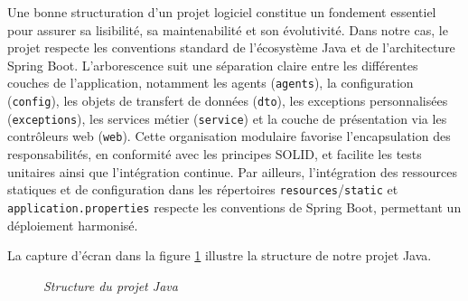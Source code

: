 \documentclass[12pt,a4paper]{report}
\begin{document}
	Une bonne structuration d’un projet logiciel constitue un fondement essentiel pour assurer sa lisibilité, sa maintenabilité et son évolutivité. Dans notre cas, le projet respecte les conventions standard de l’écosystème Java et de l’architecture Spring Boot. L’arborescence suit une séparation claire entre les différentes couches de l’application, notamment les agents (\verb|agents|), la configuration (\verb|config|), les objets de transfert de données (\verb|dto|), les exceptions personnalisées (\verb|exceptions|), les services métier (\verb|service|) et la couche de présentation via les contrôleurs web (\verb|web|). Cette organisation modulaire favorise l'encapsulation des responsabilités, en conformité avec les principes SOLID, et facilite les tests unitaires ainsi que l’intégration continue. Par ailleurs, l’intégration des ressources statiques et de configuration dans les répertoires \verb|resources|/\verb|static| et \verb|application.properties| respecte les conventions de Spring Boot, permettant un déploiement harmonisé.
	
	La capture d'écran dans la figure \ref{fig:structure-projet} illustre la structure de notre projet Java.
	
	\begin{figure}[H]
		\centering
		\caption{\textit{Structure du projet Java}}
		\label{fig:structure-projet}
	\end{figure}
	
\end{document}
